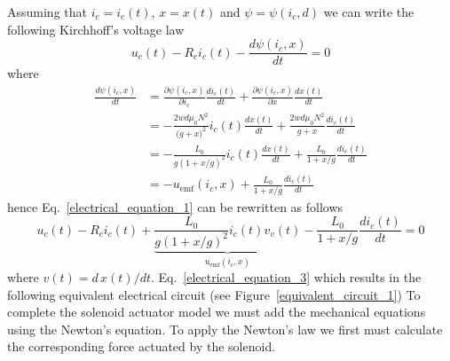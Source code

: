 \documentclass[12pt,a4paper,oneside]{book}
\begin{document}
\begin{onehalfspace}
Assuming that $i_c=i_c(t)$, $x=x(t)$ and $\psi=\psi(i_c,d)$ we can write the following Kirchhoff's voltage law
\begin{equation}\label{electrical_equation_1}
	\boxed{u_c(t)-R_ci_c(t)-\frac{d\psi(i_c,x)}{dt}=0}
\end{equation}
where 
\begin{equation}\label{electrical_equation_2}
	\begin{aligned}
		\frac{d\psi(i_c,x)}{dt}&=\frac{\partial \psi(i_c,x)}{\partial i_c}\frac{di_c(t)}{dt} + \frac{\partial \psi(i_c,x)}{\partial x}\frac{dx(t)}{dt} \\[6pt]
		&= -\frac{2wd\mu_0N^2}{\big(g+x\big)^2}i_c(t)\frac{dx(t)}{dt} + \frac{2wd\mu_0N^2}{g+x}\frac{di_c(t)}{dt} \\[6pt]
		&= -\frac{L_0}{g(1+x/g)^2}i_c(t)\frac{dx(t)}{dt} + \frac{L_0}{1+x/g}\frac{di_c(t)}{dt} \\[6pt]
		&= -u_{\text{emf}}(i_c,x) + \frac{L_0}{1+x/g}\frac{di_c(t)}{dt}
	\end{aligned}
\end{equation}
hence Eq.~\eqref{electrical_equation_1} can be rewritten as follows
\begin{equation}\label{electrical_equation_3}
	u_c(t)-R_ci_c(t)+\underbrace{\frac{L_0}{g(1+x/g)^2}i_c(t)v_v(t)}_{u_{\text{emf}}(i_c,x)} - \frac{L_0}{1+x/g}\frac{di_c(t)}{dt}=0
\end{equation}
where $v(t) = d\,x(t)/dt$. Eq.~\eqref{electrical_equation_3} which results in the following equivalent electrical circuit (see Figure~\ref{equivalent_circuit_1})
To complete the solenoid actuator model we must add the mechanical equations using the Newton's equation. To apply the Newton's law we first must calculate the corresponding force actuated by the solenoid.


\end{onehalfspace}
\end{document}
